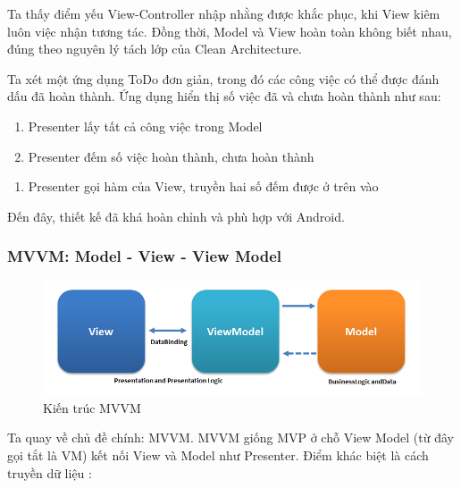 \documentclass[../../thesis]{subfiles}
\begin{document}
Ta thấy điểm yếu View-Controller nhập nhằng được khắc phục, khi View kiêm luôn
việc nhận tương tác. Đồng thời, Model và View hoàn toàn không biết nhau, đúng
theo nguyên lý tách lớp của Clean Architecture.

Ta xét một ứng dụng ToDo đơn giản, trong đó các công việc có thể được đánh dấu
đã hoàn thành. Ứng dụng hiển thị số việc đã và chưa hoàn thành như sau:

\begin{enumerate}
    \item
        Presenter lấy tất cả công việc trong Model
    \item
        Presenter đếm số việc hoàn thành, chưa hoàn thành
\end{enumerate}

\begin{enumerate}[resume, before = \vspace*{-\dimexpr\topsep+\partopsep\relax}]
    \item
        Presenter gọi hàm của View, truyền hai số đếm được ở trên vào
\end{enumerate}

Đến đây, thiết kế đã khá hoàn chỉnh và phù hợp với Android.

\subsubsection{MVVM: Model - View - View Model}

\begin{figure}
    \centering
    \vspace*{-4mm}
    \includegraphics[width=\linewidth]{../images/MVVMPattern.png}
    \vspace*{-10mm}
    \caption{Kiến trúc MVVM \cite{MUN_MVVM}}
    \label{fig:mvvm}
\end{figure}

Ta quay về chủ đề chính: MVVM. MVVM giống MVP ở chỗ View Model (từ đây gọi tắt
là VM) kết nối View và Model như Presenter. Điểm khác biệt là cách truyền dữ
liệu \cite{MUN_MVVM}:
\end{document}
